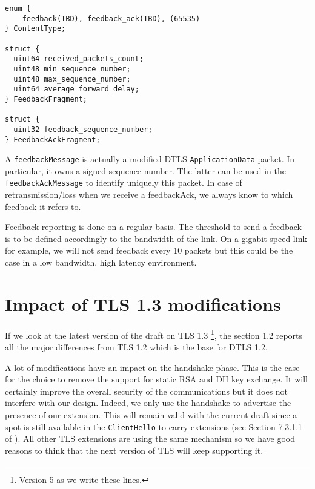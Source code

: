 
\begin{lstlisting}[caption= Feedback and Feedback Ack messages, label=lst:feedbackM]
enum {
    feedback(TBD), feedback_ack(TBD), (65535)
} ContentType;

struct {
  uint64 received_packets_count;
  uint48 min_sequence_number;
  uint48 max_sequence_number;
  uint64 average_forward_delay;
} FeedbackFragment;

struct {
  uint32 feedback_sequence_number;
} FeedbackAckFragment;
\end{lstlisting}

A \texttt{feedbackMessage} is actually a modified DTLS \texttt{ApplicationData} packet. In particular, it owns a signed sequence number. The latter can be used in the \texttt{feedbackAckMessage} to identify uniquely this packet. In case of retransmission/loss when we receive a feedbackAck, we always know to which feedback it refers to.

Feedback reporting is done on a regular basis. The threshold to send a feedback is to be defined accordingly to the bandwidth of the link. On a gigabit speed link for example, we will not send feedback every 10 packets but this could be the case in a low bandwidth, high latency environment.

\section{Impact of TLS 1.3 modifications}\label{sec:tls13impact}

If we look at the latest version of the draft on TLS 1.3 \cite{draft-tls13}\footnote{Version 5 as we write these lines.}, the section 1.2 reports all the major differences from TLS 1.2 which is the base for DTLS 1.2.

A lot of modifications have an impact on the handshake phase. This is the case for the choice to remove the support for static RSA and DH key exchange. It will certainly improve the overall security of the communications but it does not interfere with our design. Indeed, we only use the handshake to advertise the presence of our extension. This will remain valid with the current draft since a spot is still available in the \texttt{ClientHello} to carry extensions (see Section 7.3.1.1 of \cite{draft-tls13}). All other TLS extensions are using the same mechanism so we have good reasons to think that the next version of TLS will keep supporting it.

